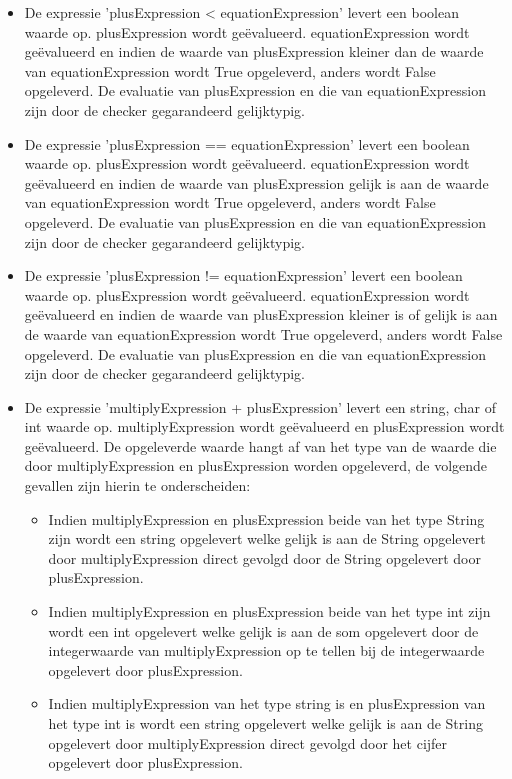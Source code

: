 \begin{itemize}
        \item De expressie 'plusExpression \textless{} equationExpression' levert een boolean waarde op. plusExpression wordt ge\"{e}valueerd. equationExpression wordt ge\"{e}valueerd en indien de waarde van plusExpression kleiner dan de waarde van equationExpression wordt True opgeleverd, anders wordt False opgeleverd. De evaluatie van plusExpression en die van equationExpression zijn door de checker gegarandeerd gelijktypig.
        \item De expressie 'plusExpression == equationExpression' levert een boolean waarde op. plusExpression wordt ge\"{e}valueerd. equationExpression wordt ge\"{e}valueerd en indien de waarde van plusExpression gelijk is aan de waarde van equationExpression wordt True opgeleverd, anders wordt False opgeleverd. De evaluatie van plusExpression en die van equationExpression zijn door de checker gegarandeerd gelijktypig.
        \item De expressie 'plusExpression != equationExpression' levert een boolean waarde op. plusExpression wordt ge\"{e}valueerd. equationExpression wordt ge\"{e}valueerd en indien de waarde van plusExpression kleiner is of gelijk is aan de waarde van equationExpression wordt True opgeleverd, anders wordt False opgeleverd. De evaluatie van plusExpression en die van equationExpression zijn door de checker gegarandeerd gelijktypig.
        \item De expressie 'multiplyExpression + plusExpression' levert een string, char of int waarde op. multiplyExpression wordt ge\"{e}valueerd en plusExpression wordt ge\"{e}valueerd. De opgeleverde waarde hangt af van het type van de waarde die door multiplyExpression en plusExpression worden opgeleverd, de volgende gevallen zijn hierin te onderscheiden:
            \begin{itemize}
            \item Indien multiplyExpression en plusExpression beide van het type String zijn wordt een string opgelevert welke gelijk is aan de String opgelevert door multiplyExpression direct gevolgd door de String opgelevert door plusExpression.
            \item Indien multiplyExpression en plusExpression beide van het type int zijn wordt een int opgelevert welke gelijk is aan de som opgelevert door de integerwaarde van multiplyExpression op te tellen bij de integerwaarde opgelevert door plusExpression.
            \item Indien multiplyExpression van het type string is en plusExpression van het type int is wordt een string opgelevert welke gelijk is aan de String opgelevert door multiplyExpression direct gevolgd door het cijfer opgelevert door plusExpression.

\end{itemize}
\end{itemize}
